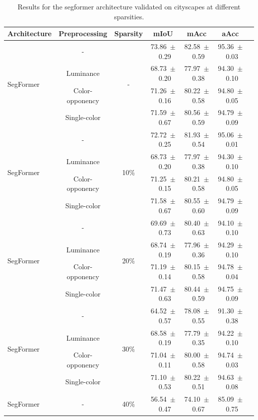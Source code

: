 \begin{table}[h]
\centering
\caption{Results for the segformer architecture validated on cityscapes at different sparsities.}
\begin{tabular}{@{}lccc ccc@{}}
\toprule
Architecture & Preprocessing & Sparsity & mIoU & mAcc & aAcc \\
\midrule

\multirow{4}{*}{SegFormer} & - & \multirow{4}{*}{-} & 73.86~$\pm$~0.29 & 82.58~$\pm$~0.59 & 95.36~$\pm$~0.03 \\
& Luminance & & 68.73~$\pm$~0.20 & 77.97~$\pm$~0.38 & 94.30~$\pm$~0.10 \\
& Color-opponency & & 71.26~$\pm$~0.16 & 80.22~$\pm$~0.58 & 94.80~$\pm$~0.05 \\
& Single-color & & 71.59~$\pm$~0.67 & 80.56~$\pm$~0.59 & 94.79~$\pm$~0.09 \\
\midrule
\multirow{4}{*}{SegFormer} & - & \multirow{4}{*}{10\%} & 72.72~$\pm$~0.25 & 81.93~$\pm$~0.54 & 95.06~$\pm$~0.01 \\
& Luminance & & 68.73~$\pm$~0.20 & 77.97~$\pm$~0.38 & 94.30~$\pm$~0.10 \\
& Color-opponency & & 71.25~$\pm$~0.15 & 80.21~$\pm$~0.58 & 94.80~$\pm$~0.05 \\
& Single-color & & 71.58~$\pm$~0.67 & 80.55~$\pm$~0.60 & 94.79~$\pm$~0.09 \\
\midrule
\multirow{4}{*}{SegFormer} & - & \multirow{4}{*}{20\%} & 69.69~$\pm$~0.73 & 80.40~$\pm$~0.63 & 94.10~$\pm$~0.10 \\
& Luminance & & 68.74~$\pm$~0.19 & 77.96~$\pm$~0.36 & 94.29~$\pm$~0.10 \\
& Color-opponency & & 71.19~$\pm$~0.14 & 80.15~$\pm$~0.58 & 94.78~$\pm$~0.04 \\
& Single-color & & 71.47~$\pm$~0.63 & 80.44~$\pm$~0.59 & 94.75~$\pm$~0.09 \\
\midrule
\multirow{4}{*}{SegFormer} & - & \multirow{4}{*}{30\%} & 64.52~$\pm$~0.57 & 78.08~$\pm$~0.55 & 91.30~$\pm$~0.38 \\
& Luminance & & 68.58~$\pm$~0.19 & 77.79~$\pm$~0.35 & 94.22~$\pm$~0.10 \\
& Color-opponency & & 71.04~$\pm$~0.11 & 80.00~$\pm$~0.58 & 94.74~$\pm$~0.03 \\
& Single-color & & 71.10~$\pm$~0.53 & 80.22~$\pm$~0.51 & 94.63~$\pm$~0.08 \\
\midrule
\multirow{4}{*}{SegFormer} & - & \multirow{4}{*}{40\%} & 56.54~$\pm$~0.47 & 74.10~$\pm$~0.67 & 85.09~$\pm$~0.75 \\

\end{tabular}
\end{table}

